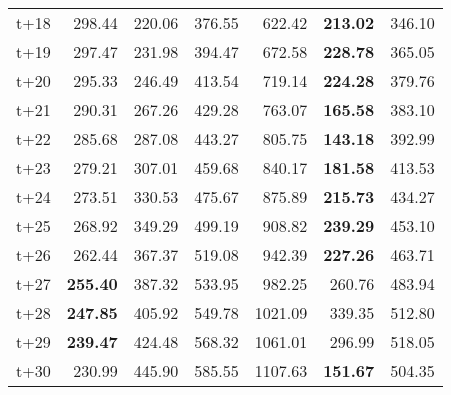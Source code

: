 \begin{table}[H]
\begin{tabular}{lrrrrrr}
t+18  & 298.44  & 220.06  & 376.55  & 622.42  & \textbf{213.02}  & 346.10  \\
t+19  & 297.47  & 231.98  & 394.47  & 672.58  & \textbf{228.78}  & 365.05  \\
t+20  & 295.33  & 246.49  & 413.54  & 719.14  & \textbf{224.28}  & 379.76  \\
t+21  & 290.31  & 267.26  & 429.28  & 763.07  & \textbf{165.58}  & 383.10  \\
t+22  & 285.68  & 287.08  & 443.27  & 805.75  & \textbf{143.18}  & 392.99  \\
t+23  & 279.21  & 307.01  & 459.68  & 840.17  & \textbf{181.58}  & 413.53  \\
t+24  & 273.51  & 330.53  & 475.67  & 875.89  & \textbf{215.73}  & 434.27  \\
t+25  & 268.92  & 349.29  & 499.19  & 908.82  & \textbf{239.29}  & 453.10  \\
t+26  & 262.44  & 367.37  & 519.08  & 942.39  & \textbf{227.26}  & 463.71  \\
t+27  & \textbf{255.40}  & 387.32  & 533.95  & 982.25  & 260.76  & 483.94  \\
t+28  & \textbf{247.85}  & 405.92  & 549.78  & 1021.09  & 339.35  & 512.80  \\
t+29  & \textbf{239.47}  & 424.48  & 568.32  & 1061.01  & 296.99  & 518.05  \\
t+30  & 230.99  & 445.90  & 585.55  & 1107.63  & \textbf{151.67}  & 504.35  \\

\bottomrule
\end{tabular}
\end{table}
